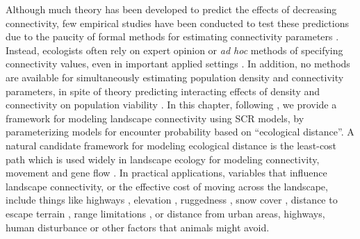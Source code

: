 Although much theory has been developed to
predict the effects of decreasing connectivity, few empirical studies
have been conducted to test these predictions due to the paucity of
formal methods for estimating connectivity parameters
\citep{cushman_etal:2010}. Instead, ecologists often rely on expert
opinion or \textit{ad hoc} methods of specifying connectivity values,
even in important applied settings
\citep{adriaensen_etal:2003,beier_etal:2008,zeller_etal:2012}. In
addition, no methods are available for simultaneously estimating
population density and connectivity parameters, in spite of theory
predicting interacting effects of density and connectivity on
population viability \citep{tischendorf_etal:2005,cushman_etal:2010}.
In this chapter, following \citet{royle_etal:2012ecol}, we provide a
framework for modeling landscape connectivity using SCR models, by
parameterizing models for encounter probability based on ``ecological
distance''.  A natural candidate framework for modeling ecological
distance is the least-cost path which is used widely in landscape
ecology for modeling connectivity, movement and gene flow
\citep{adriaensen_etal:2003,manel_etal:2003,mcrae_etal:2008}.  In
practical applications, variables that influence landscape
connectivity, or the effective cost of moving across the landscape,
include things like highways \citep[e.g.,][]{epps_etal:2005},
elevation \citep{cushman_etal:2006}, ruggedness
\citep{epps_etal:2007}, snow cover \citep{schwartz_etal:2009},
distance to escape terrain \citep{shirk_etal:2010}, range limitations
\citep{mcrae_beier:2007}, or distance from urban areas, highways,
human disturbance or other factors that animals might avoid.


